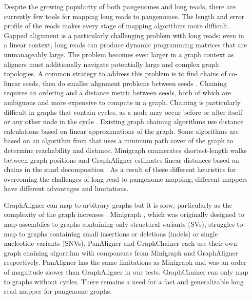 \documentclass[11pt]{ucscthesis}
\begin{document}
Despite the growing popularity of both pangenomes and long reads, there are currently few tools for mapping long reads to pangenomes.
The length and error profile of the reads makes every stage of mapping algorithms more difficult.
Gapped alignment is a particularly challenging problem with long reads; even in a linear context, long reads can produce dynamic programming matrices that are unmanageably large.
The problem becomes even larger in a graph context as aligners must additionally navigate potentially large and complex graph topologies.
A common strategy to address this problem is to find chains of co-linear seeds, then do smaller alignment problems between seeds \cite{minimap2_2021,li_minigraph_2020,panaligner_2024,ma_graphchainer_2023}.
Chaining requires an ordering and a distance metric between seeds, both of which are ambiguous and more expensive to compute in a graph.
Chaining is particularly difficult in graphs that contain cycles, as a node may occur before or after itself or any other node in the cycle \cite{chandra_gap-sensitive_chaining_2023,ma_graphchainer_2023,makinen_dag_chaining_2019}.
Existing graph chaining algorithms use distance calculations based on linear approximations of the graph.
Some algorithms \cite{chandra_gap-sensitive_chaining_2023,ma_graphchainer_2023} are based on an algorithm from \citet{makinen_dag_chaining_2019} that uses a minimum path cover of the graph to determine reachability and distance.
Minigraph enumerates shortest-length walks between graph positions \cite{li_minigraph_2020} and GraphAligner estimates linear distances based on chains in the snarl decomposition \cite{rautiainen_graphaligner_2020}.
As a result of these different heuristics for overcoming the challenges of long read-to-pangenome mapping, different mappers have different advantages and limitations.

GraphAligner can map to arbitrary graphs but it is slow, particularly as the complexity of the graph increases \cite{rautiainen_graphaligner_2020}.
Minigraph \cite{li_minigraph_2020}, which was originally designed to map assemblies to graphs containing only structural variants (SVs), struggles to map to graphs containing small insertions or deletions (indels) or single nucleotide variants (SNVs).
PanAligner \citep{panaligner_2024} and GraphChainer \citep{ma_graphchainer_2023} each use their own graph chaining algorithm with components from Minigraph and GraphAligner respectively.
PanAligner has the same limitations as Minigraph and was an order of magnitude slower than GraphAligner in our tests.
GraphChainer can only map to graphs without cycles.
There remains a need for a fast and generalizable long read mapper for pangenome graphs.
\end{document}
